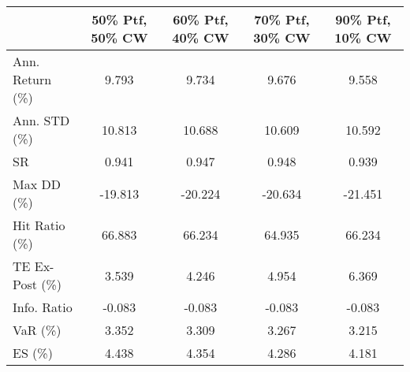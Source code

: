 \begin{tabular}{lcccc}
\toprule
{} &  50\% Ptf, 50\% CW &  60\% Ptf, 40\% CW &  70\% Ptf, 30\% CW &  90\% Ptf, 10\% CW \\
\midrule
Ann. Return (\%) &            9.793 &            9.734 &            9.676 &            9.558 \\
Ann. STD (\%)    &           10.813 &           10.688 &           10.609 &           10.592 \\
SR              &            0.941 &            0.947 &            0.948 &            0.939 \\
Max DD (\%)      &          -19.813 &          -20.224 &          -20.634 &          -21.451 \\
Hit Ratio (\%)   &           66.883 &           66.234 &           64.935 &           66.234 \\
TE Ex-Post (\%)  &            3.539 &            4.246 &            4.954 &            6.369 \\
Info. Ratio     &           -0.083 &           -0.083 &           -0.083 &           -0.083 \\
VaR (\%)         &            3.352 &            3.309 &            3.267 &            3.215 \\
ES (\%)          &            4.438 &            4.354 &            4.286 &            4.181 \\
\bottomrule
\end{tabular}
